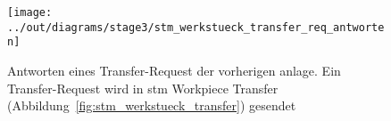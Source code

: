 \begin{figure}
    \centering
    \texttt{[image: ../out/diagrams/stage3/stm\_werkstueck\_transfer\_req\_antworten]}
    \caption{Antworten eines Transfer-Request der vorherigen \gls{anlage}.
    Ein Transfer-Request wird in stm Workpiece Transfer (Abbildung~\ref{fig:stm_werkstueck_transfer}) gesendet}
    \label{fig:stm_werkstueck_transfer_req_antworten}
\end{figure}



